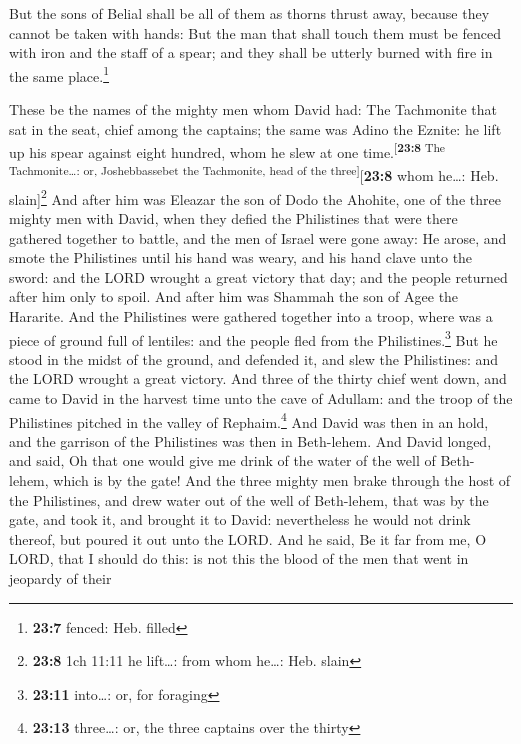  But the sons of Belial shall be all of them as thorns
thrust away, because they cannot be taken with hands:  But
the man that shall touch them must be fenced with iron and the staff of
a spear; and they shall be utterly burned with fire in the same
place.\footnote{\textbf{23:7} fenced: Heb. filled}

 These be the names of the mighty men whom David had: The
Tachmonite that sat in the seat, chief among the captains; the same was
Adino the Eznite: he lift up his spear against eight hundred, whom he
slew at one time.\textsuperscript{{[}\textbf{23:8} The Tachmonite\ldots:
or, Joshebbassebet the Tachmonite, head of the three{]}}{[}\textbf{23:8}
whom he\ldots: Heb. slain{]}\footnote{\textbf{23:8} 1ch 11:11 he
  lift\ldots: from whom he\ldots: Heb. slain}  And after
him was Eleazar the son of Dodo the Ahohite, one of the three mighty men
with David, when they defied the Philistines that were there gathered
together to battle, and the men of Israel were gone away:
 He arose, and smote the Philistines until his hand was
weary, and his hand clave unto the sword: and the LORD wrought a great
victory that day; and the people returned after him only to spoil.
 And after him was Shammah the son of Agee the Hararite.
And the Philistines were gathered together into a troop, where was a
piece of ground full of lentiles: and the people fled from the
Philistines.\footnote{\textbf{23:11} into\ldots: or, for foraging}
 But he stood in the midst of the ground, and defended
it, and slew the Philistines: and the LORD wrought a great victory.
 And three of the thirty chief went down, and came to
David in the harvest time unto the cave of Adullam: and the troop of the
Philistines pitched in the valley of Rephaim.\footnote{\textbf{23:13}
  three\ldots: or, the three captains over the thirty} 
And David was then in an hold, and the garrison of the Philistines was
then in Beth-lehem.  And David longed, and said, Oh that
one would give me drink of the water of the well of Beth-lehem, which is
by the gate!  And the three mighty men brake through the
host of the Philistines, and drew water out of the well of Beth-lehem,
that was by the gate, and took it, and brought it to David: nevertheless
he would not drink thereof, but poured it out unto the LORD.
 And he said, Be it far from me, O LORD, that I should do
this: is not this the blood of the men that went in jeopardy of their

